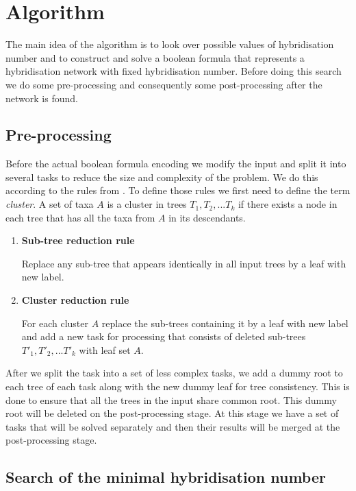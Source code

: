 \documentclass[runningheads, envcountsame, a4paper]{llncs}
\begin{document}
\section{Algorithm}

The main idea of the algorithm is to look over possible values of hybridisation number and to construct and solve a boolean 
formula that represents a hybridisation network with fixed hybridisation number. Before doing this search we do some 
pre-processing and consequently some post-processing after the network is found.

\subsection{Pre-processing}

Before the actual boolean formula encoding we modify the input and split it into several tasks to reduce the size 
and complexity of the problem. We do this according to the rules from \cite {bonet2009efficiently}. To define those 
rules we first need to define the term \emph{cluster}. A set of taxa $A$ is a cluster in trees $T_1, T_2, ... T_k$ if there 
exists a node in each tree that has all the taxa from $A$ in its descendants.

\begin{enumerate}

\item \textbf{Sub-tree reduction rule}

Replace any sub-tree that appears identically in all input trees by a leaf with new label.

\item \textbf{Cluster reduction rule}

For each cluster $A$ replace the sub-trees containing it by a leaf with new label and add a new task for processing 
that consists of deleted sub-trees $T'_1, T'_2, ... T'_k$ with leaf set $A$.

\end{enumerate}

After we split the task into a set of less complex tasks, we add a dummy root to each tree of each task along with 
the new dummy leaf for tree consistency. This is done to ensure that all the trees in the input share common root. 
This dummy root will be deleted on the post-processing stage. At this stage we have a set of tasks that will be solved 
separately and then their results will be merged at the post-processing stage.

\subsection{Search of the minimal hybridisation number}
\end{document}
